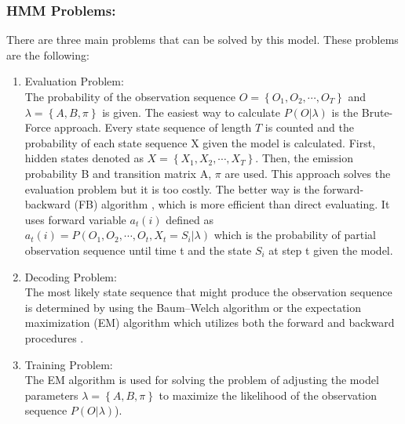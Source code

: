 \subsubsection*{HMM Problems:}
There are three main problems that can be solved by this model. These problems are the following:
\begin{enumerate}
\item{Evaluation Problem:}\\
The probability of the observation sequence  $O=\left \{ O_{1},O_{2},\cdots,O_{T} \right \}$ and  $\lambda =\left \{ A,B,\pi  \right \}$ is given.
The easiest way to calculate $P(O|\lambda )$ is the Brute-Force approach. Every state sequence of length $T$ is counted and the probability of each state sequence X given the model is calculated. First, hidden states denoted as $X=\left \{ X_{1},X_{2},\cdots,X_{T} \right \}$. Then, the emission probability B and transition matrix A, $\pi $ are used.
This approach solves the evaluation problem but it is too costly. The better way is the forward-backward (FB) algorithm \cite{DBLP:conf/interspeech/Bilmes98}, which is more efficient than direct evaluating. It uses forward variable $a_{t}(i)$ defined as
$a_{t}(i)= P( O_{1},O_{2},\cdots,O_{t} ,X_{t}=S_{i}|\lambda )$ which is the probability of partial observation sequence until time t and the state $S_{i}$ at step t given the model.\vspace*{-3mm} 
\item{Decoding Problem:}\\ The most likely state sequence that might produce the observation sequence is determined by using the Baum–Welch algorithm or the expectation maximization (EM) algorithm which utilizes both the forward and backward procedures \cite{DBLP:conf/icassp/Poritz88}.\vspace*{-3mm}
\item{Training Problem:}\\ The EM algorithm is used for solving the problem of adjusting the model parameters   $\lambda =\left \{ A,B,\pi  \right \}$   to maximize the likelihood of the observation sequence $P(O|\lambda )$).
\end{enumerate}

